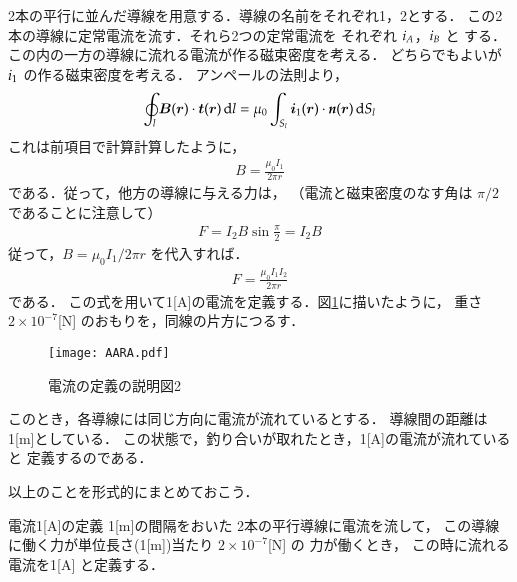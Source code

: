             2本の平行に並んだ導線を用意する．導線の名前をそれぞれ1，2とする．
            この2本の導線に定常電流を流す．それら2つの定常電流を
            それぞれ $\textit{\textit{i}}_{A}$，$\textit{\textit{i}}_{B}$ と
            する．この内の一方の導線に流れる電流が作る磁束密度を考える．
            どちらでもよいが $\textit{\textit{i}}_{1}$ の作る磁束密度を考える．
            アンペールの法則より，
                \begin{align*}
                    \oint_{l} \boldsymbol{B}(\boldsymbol{r})\cdot\boldsymbol{t}(\boldsymbol{r})\,\mathrm{d} l
                    =\mu_{0}\int_{S_{l}} \boldsymbol{i}_{1}(\boldsymbol{r})
                    \cdot\textit{\textbf{n}}(\boldsymbol{r})\,\mathrm{d} S_{l}
                \end{align*}
            これは前項目で計算計算したように，
                \begin{align*}
                    B=\frac{\mu_{0}I_{1}}{2\pi r}
                \end{align*}
            である．従って，他方の導線に与える力は，
            （電流と磁束密度のなす角は $\pi/2$ であることに注意して）
                \begin{align*}
                    F=I_{2}B\sin\frac{\pi}{2}=I_{2}B
                \end{align*}
            従って，$B=\mu_{0}I_{1}/2\pi r$ を代入すれば．
                \begin{align}
                F=\frac{\mu_{0}I_{1}I_{2}}{2\pi r}
                \end{align}
            である．
            この式を用いて1[A]の電流を定義する．図\ref{fig:AARA}に描いたように，
            重さ $2\times10^{-7}$[N] のおもりを，同線の片方につるす．
                \begin{figure}[hbt]
                    \begin{center}
                        \texttt{[image: AARA.pdf]}
                        \caption{電流の定義の説明図2}
                        \label{fig:AARA}
                    \end{center}
                \end{figure}

            このとき，各導線には同じ方向に電流が流れているとする．
            導線間の距離は1[m]としている．
            この状態で，釣り合いが取れたとき，1[A]の電流が流れていると
            定義するのである．

            以上のことを形式的にまとめておこう．
                \begin{myshadebox}{電流1[A]の定義}
                    1[m]の間隔をおいた
                    2本の平行導線に電流を流して，
                    この導線に働く力が単位長さ(1[m])当たり $2\times10^{-7}$[N] の
                    力が働くとき，
                    この時に流れる電流を1[A]
                    と定義する．
                \end{myshadebox}
